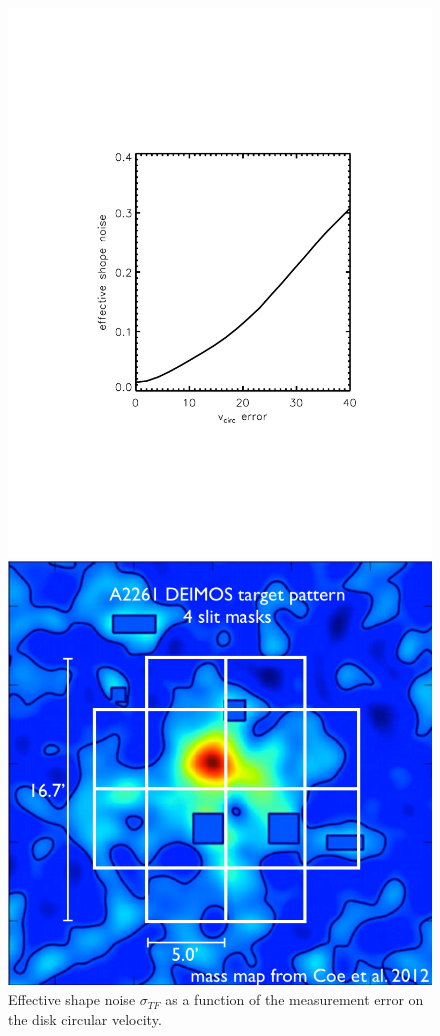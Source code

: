 \documentclass[12pt]{article}
\begin{document}
\begin{figure}[H]
  \parbox{0.45\linewidth}{
    \begin{center}
    \includegraphics[width=\linewidth, bb= 150 150 590 650,clip]{Plots/vcirc_error.pdf}
    \caption{\footnotesize Effective shape noise $\sigma_{TF}$ as a  function of the
      measurement error on the disk circular velocity.}
    \label{fig:shapeNoise}
    \end{center}
  }
  \qquad
  \begin{minipage}{0.45\linewidth}
    \begin{center}
    \includegraphics[width=0.85\linewidth]{Plots/a2261_deimos_mask.pdf}

\end{center}
\end{minipage}
\end{figure}
\end{document}

